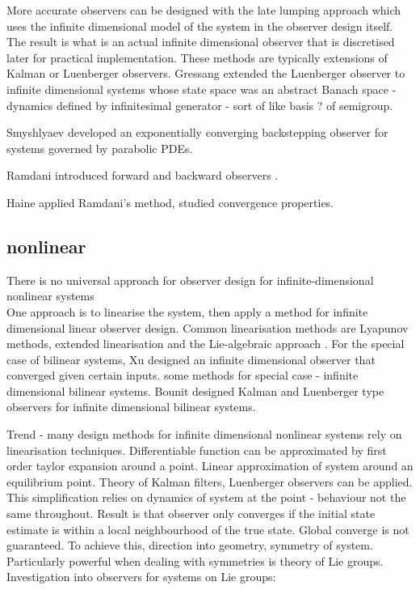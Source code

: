 More accurate observers can be designed with the late lumping approach which uses the infinite dimensional model of the system in the observer design itself. The result is what is an actual infinite dimensional observer that is discretised later for practical implementation. These methods are typically extensions of Kalman or Luenberger observers. 
Gressang \cite{gressang1975observers} extended the Luenberger observer to infinite dimensional systems whose state space was an abstract Banach space - dynamics defined by infinitesimal generator - sort of like basis ? of semigroup.

Smyshlyaev \cite{smyshlyaev2005backstepping} developed an exponentially converging backstepping observer for systems governed by parabolic PDEs.

Ramdani introduced forward and backward observers \cite{ramdani2010recovering}.

Haine \cite{haine2014recovering} applied Ramdani's method, studied convergence properties.

\subsection{nonlinear}
There is no universal approach for observer design for infinite-dimensional nonlinear systems\\
One approach is to linearise the system, then apply a method for infinite dimensional linear observer design. Common linearisation methods are Lyapunov methods, extended linearisation and the Lie-algebraic approach \cite{primbs1996survey}.
For the special case of bilinear systems, Xu \cite{xu1995observer} designed an infinite dimensional observer that converged given certain inputs. some methods for special case - infinite dimensional bilinear systems. Bounit \cite{bounit1997observers} designed Kalman and Luenberger type observers for infinite dimensional bilinear systems. 

Trend - many design methods for infinite dimensional nonlinear systems rely on linearisation techniques. Differentiable function can be approximated by first order taylor expansion around a point. Linear approximation of system around an equilibrium point. Theory of Kalman filters, Luenberger observers can be applied. This simplification relies on dynamics of system at the point -  behaviour not the same throughout. Result is that observer only converges if the initial state estimate is within a local neighbourhood of the true state. Global converge is not guaranteed. 
To achieve this, direction into geometry, symmetry of system. Particularly powerful when dealing with symmetries is theory of Lie groups.
Investigation into observers for systems on Lie groups:

